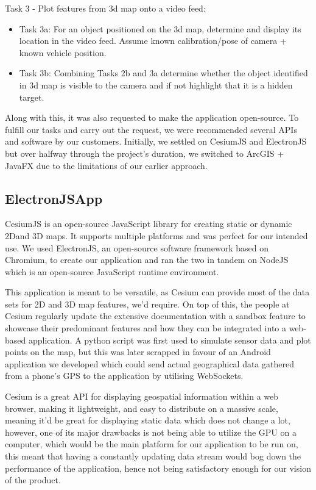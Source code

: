 \documentclass{l3proj}
\begin{document}
Task 3 - Plot features from 3d map onto a video feed:
\begin{itemize}
	\item Task 3a: For an object positioned on the 3d map, determine and display its location in the video feed. Assume known calibration/pose of camera + known vehicle position. 
	\item Task 3b: Combining Tasks 2b and 3a determine whether the object identified in 3d map is visible to the camera and if not highlight that it is a hidden target.   
\end{itemize}

Along with this, it was also requested to make the application open-source. To fulfill our tasks and carry out the request, we were recommended several APIs and software by our customers. Initially, we settled on CesiumJS and ElectronJS but over halfway through the project’s duration, we switched to ArcGIS + JavaFX due to the limitations of our earlier approach.

\subsection{ElectronJSApp}

CesiumJS is an open-source JavaScript library for creating static or dynamic 2Dand 3D maps. It supports multiple platforms and was perfect for our intended use. We used ElectronJS, an open-source software framework based on Chromium, to create our application and ran the two in tandem on NodeJS which is an open-source JavaScript runtime environment.

This application is meant to be versatile, as Cesium can provide most of the data sets for 2D and 3D map features, we'd require. On top of this, the people at Cesium regularly update the extensive documentation with a sandbox feature to showcase their predominant features and how they can be integrated into a web-based application. A python script was first used to simulate sensor data and plot points on the map, but this was later scrapped in favour of an Android application we developed which could send actual geographical data gathered from a phone’s GPS to the application by utilising WebSockets.

Cesium is a great API for displaying geospatial information within a web browser, making it lightweight, and easy to distribute on a massive scale, meaning it'd be great for displaying static data which does not change a lot, however, one of its major drawbacks is not being able to utilize the GPU on a computer, which would be the main platform for our application to be run on, this meant that having a constantly updating data stream would bog down the performance of the application, hence not being satisfactory enough for our vision of the product.
\end{document}
